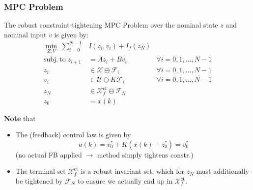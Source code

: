 \subsubsection{MPC Problem}
The robust constraint-tightening MPC Problem over the nominal state $z$ and nominal input $v$ is given by:
\begin{align*}
    \min_{Z,V}\;         \sum_{i=0}^{N-1}                                                               & I(z_{i},v_{i})+I_{f}(z_{N})                                                \\
    \mathrm{subj.~to}\;                                                                         z_{i+1} & =Az_{i}+Bv_{i}                               & \forall i=0, 1, \ldots, N-1 \\
    z_{i}                                                                                               & \in\mathcal{X}\ominus\mathcal{F}_{i}         & \forall i=0, 1, \ldots, N-1 \\
    v_i                                                                                                 & \in\mathcal{U}\ominus K\mathcal{F}_i         & \forall i=0, 1, \ldots, N-1 \\
    z_{N}                                                                                               & \in\mathcal{X}_{f}^{ct}\ominus \mathcal{F}_N                               \\
    z_0                                                                                                 & =x(k)
\end{align*}

\textbf{Note} that
\begin{itemize}
    \item The (feedback) control law is given by
          \begin{equation*}
              u(k) = v_0^* + K(x(k) - z_0^*) = v_0^*
          \end{equation*}
          (no actual FB applied $\rightarrow$ method simply tightens constr.)
    \item The terminal set $\mathcal{X}_f^{\mathrm{ct}}$ is a robust invariant set, which for $z_{N}$ must additionally be tightened by $\mathcal{F}_N$ to ensure we actually end up in $\mathcal{X}_f^{\mathrm{ct}}$.
\end{itemize}

